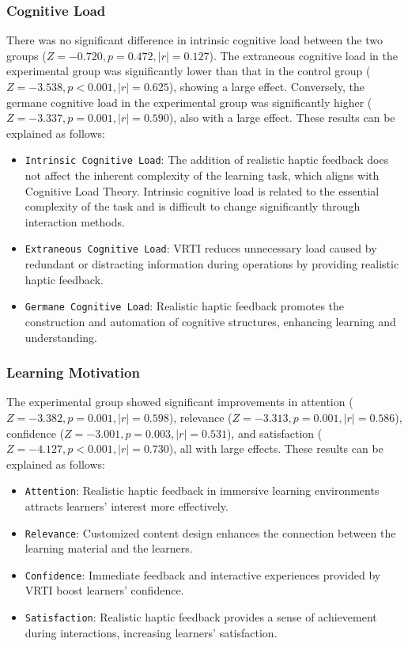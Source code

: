 \documentclass[runningheads]{llncs}
\begin{document}
\subsubsection{Cognitive Load}
There was no significant difference in intrinsic cognitive load between the two groups ($Z=-0.720, p=0.472, |r|=0.127$). The extraneous cognitive load in the experimental group was significantly lower than that in the control group ($Z=-3.538, p<0.001, |r|=0.625$), showing a large effect. Conversely, the germane cognitive load in the experimental group was significantly higher ($Z=-3.337, p=0.001, |r|=0.590$), also with a large effect. These results can be explained as follows:

\begin{itemize}
\item {\texttt{Intrinsic Cognitive Load}}: The addition of realistic haptic feedback does not affect the inherent complexity of the learning task, which aligns with Cognitive Load Theory. Intrinsic cognitive load is related to the essential complexity of the task and is difficult to change significantly through interaction methods.

\item {\texttt{Extraneous Cognitive Load}}: VRTI reduces unnecessary load caused by redundant or distracting information during operations by providing realistic haptic feedback.

\item {\texttt{Germane Cognitive Load}}: Realistic haptic feedback promotes the construction and automation of cognitive structures, enhancing learning and understanding.
\end{itemize}

\subsubsection{Learning Motivation}
The experimental group showed significant improvements in attention ($Z=-3.382, p=0.001, |r|=0.598$), relevance ($Z=-3.313, p=0.001, |r|=0.586$), confidence ($Z=-3.001, p=0.003, |r|=0.531$), and satisfaction ($Z=-4.127, p<0.001, |r|=0.730$), all with large effects. These results can be explained as follows:

\begin{itemize}
  \item {\texttt{Attention}}: Realistic haptic feedback in immersive learning environments attracts learners' interest more effectively.

  \item {\texttt{Relevance}}: Customized content design enhances the connection between the learning material and the learners.

  \item {\texttt{Confidence}}: Immediate feedback and interactive experiences provided by VRTI boost learners' confidence.

  \item {\texttt{Satisfaction}}: Realistic haptic feedback provides a sense of achievement during interactions, increasing learners' satisfaction.
\end{itemize}
\end{document}
